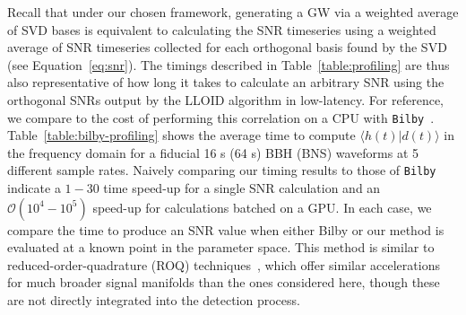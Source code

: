 \documentclass[twocolumn,prd,superscriptaddress,nofootinbib]{revtex4-1}
\begin{document}
Recall that under our chosen framework, generating a GW via a weighted average
of SVD bases is equivalent to calculating the SNR timeseries using a weighted
average of SNR timeseries collected for each orthogonal basis found by the SVD
(see Equation~\ref{eq:snr}). The timings described in
Table~\ref{table:profiling} are thus also representative of how long it takes
to calculate an arbitrary SNR using the orthogonal SNRs output by the LLOID
algorithm in low-latency. For reference, we compare to the cost of performing this correlation
on a CPU with \texttt{Bilby}~\cite{Ashton:2018jfp}.
Table~\ref{table:bilby-profiling} shows the average time to compute $\langle h(t) | d(t)
\rangle$ in the frequency domain for a fiducial 16 s (64 s) BBH (BNS) waveforms at 5
different sample rates. Naively comparing our timing results to those of \texttt{Bilby}
indicate a $1-30$ time speed-up for a single SNR calculation and an
$\mathcal{O}(10^4-10^5)$ speed-up for calculations batched on a GPU. In each case, we 
compare the time to produce an SNR value when either Bilby or our
method is evaluated at a known point in the parameter space. This method is similar
to reduced-order-quadrature (ROQ)
techniques~\cite{Canizares:2014fya,Smith:2016qas,Morisaki:2020oqk}, which offer
similar accelerations for much broader signal manifolds than the ones
considered here, though these are not directly integrated into the detection
process.
\end{document}
